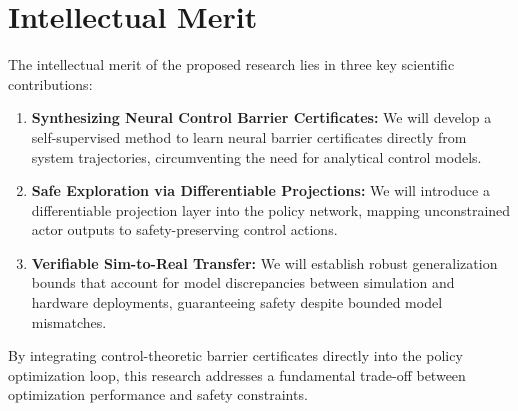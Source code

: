 \section{Intellectual Merit}
The intellectual merit of the proposed research lies in three key scientific contributions:
\begin{enumerate}
    \item \textbf{Synthesizing Neural Control Barrier Certificates:} We will develop a self-supervised method to learn neural barrier certificates directly from system trajectories, circumventing the need for analytical control models.
    \item \textbf{Safe Exploration via Differentiable Projections:} We will introduce a differentiable projection layer into the policy network, mapping unconstrained actor outputs to safety-preserving control actions.
    \item \textbf{Verifiable Sim-to-Real Transfer:} We will establish robust generalization bounds that account for model discrepancies between simulation and hardware deployments, guaranteeing safety despite bounded model mismatches.
\end{enumerate}

By integrating control-theoretic barrier certificates directly into the policy optimization loop, this research addresses a fundamental trade-off between optimization performance and safety constraints.
